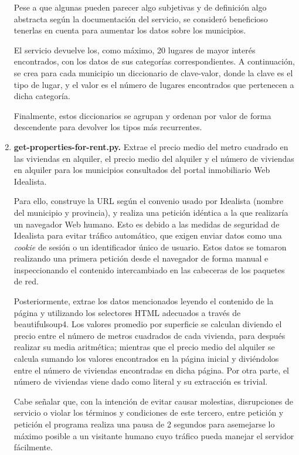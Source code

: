 \begin{enumerate}
    Pese a que algunas pueden parecer algo subjetivas y de definición algo abstracta según la documentación del servicio, se consideró beneficioso tenerlas en cuenta para aumentar los datos sobre los municipios.

    El servicio devuelve los, como máximo, 20 lugares de mayor interés encontrados, con los datos de sus categorías correspondientes. A continuación, se crea para cada municipio un diccionario de clave-valor, donde la clave es el tipo de lugar, y el valor es el número de lugares encontrados que pertenecen a dicha categoría.

    Finalmente, estos diccionarios se agrupan y ordenan por valor de forma descendente para devolver los tipos más recurrentes.

    \item \textbf{get-properties-for-rent.py.} Extrae el precio medio del metro cuadrado en las viviendas en alquiler, el precio medio del alquiler y el número de viviendas en alquiler para los municipios consultados del portal inmobiliario Web Idealista.

    Para ello, construye la URL según el convenio usado por Idealista (nombre del municipio y provincia), y realiza una petición idéntica a la que realizaría un navegador Web humano. Esto es debido a las medidas de seguridad de Idealista para evitar tráfico automático, que exigen enviar datos como una \textit{cookie} de sesión o un identificador único de usuario. Estos datos se tomaron realizando una primera petición desde el navegador de forma manual e inspeccionando el contenido intercambiado en las cabeceras de los paquetes de red.

    Posteriormente, extrae los datos mencionados leyendo el contenido de la página y utilizando los selectores HTML adecuados a través de beautifulsoup4. Los valores promedio por superficie se calculan diviendo el precio entre el número de metros cuadrados de cada vivienda, para después realizar su media aritmética; mientras que el precio medio del alquiler se calcula sumando los valores encontrados en la página inicial y diviéndolos entre el número de viviendas encontradas en dicha página. Por otra parte, el número de viviendas viene dado como literal y su extracción es trivial.

    Cabe señalar que, con la intención de evitar causar molestias, disrupciones de servicio o violar los términos y condiciones de este tercero, entre petición y petición el programa realiza una pausa de 2 segundos para asemejarse lo máximo posible a un visitante humano cuyo tráfico pueda manejar el servidor fácilmente.


\end{enumerate}
